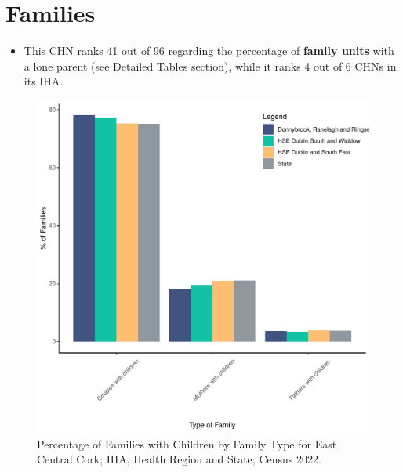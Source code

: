 \documentclass{article}
\begin{document}
\section{Families}\label{sect:Fam}
\begin{itemize}
\item This CHN ranks  41 out of 96 regarding the percentage of \textbf{family units} with a lone parent (see Detailed Tables section), while it ranks   4 out of 6 CHNs in its IHA.
\end{itemize}
\begin{figure}[H]
	\centering
	\includegraphics[width = 150mm]{../figures/FamED.pdf}
	\caption{Percentage of Families with Children by Family Type for East Central Cork; IHA, Health Region and State; Census 2022.}
	\label{fig:vbnv}
	\end{figure}
	
\end{document}
